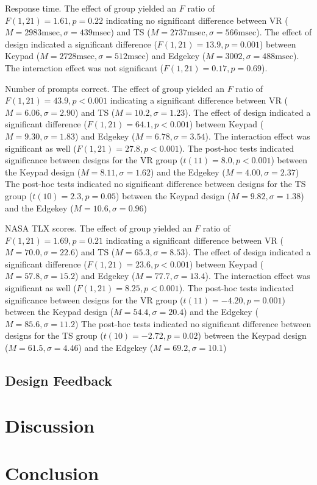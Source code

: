 Response time.
The effect of group yielded an $F$ ratio of $F(1, 21) = 1.61, p = 0.22$ indicating no significant difference between VR ($M = 2983\mathrm{msec}, \sigma = 439\mathrm{msec}$) and TS ($M = 2737\mathrm{msec}, \sigma = 566\mathrm{msec}$).
The effect of design indicated a significant difference ($F(1, 21) = 13.9, p = 0.001$) between Keypad ($M=2728\mathrm{msec}, \sigma=512\mathrm{msec}$) and Edgekey ($M=3002, \sigma=488\mathrm{msec}$).
The interaction effect was not significant ($F(1, 21) = 0.17, p = 0.69$).

Number of prompts correct.
The effect of group yielded an $F$ ratio of $F(1, 21) = 43.9, p < 0.001$ indicating a significant difference between VR ($M = 6.06, \sigma = 2.90$) and TS ($M = 10.2, \sigma = 1.23$).
The effect of design indicated a significant difference ($F(1, 21) = 64.1, p < 0.001$) between Keypad ($M = 9.30, \sigma=1.83$) and Edgekey ($M=6.78, \sigma=3.54$).
The interaction effect was significant as well ($F(1, 21) = 27.8, p < 0.001$).
The post-hoc tests indicated significance between designs for the VR group ($t(11) = 8.0, p < 0.001$) between the Keypad design ($M = 8.11, \sigma = 1.62$) and the Edgekey ($M = 4.00, \sigma = 2.37$)
The post-hoc tests indicated no significant difference between designs for the TS group ($t(10) = 2.3, p = 0.05$) between the Keypad design ($M = 9.82, \sigma = 1.38$) and the Edgekey ($M = 10.6, \sigma = 0.96$)

NASA TLX scores.
The effect of group yielded an $F$ ratio of $F(1, 21) = 1.69, p = 0.21$ indicating a significant difference between VR ($M = 70.0, \sigma = 22.6$) and TS ($M = 65.3, \sigma = 8.53$).
The effect of design indicated a significant difference ($F(1, 21) = 23.6, p < 0.001$) between Keypad ($M = 57.8, \sigma=15.2$) and Edgekey ($M=77.7, \sigma=13.4$).
The interaction effect was significant as well ($F(1, 21) = 8.25, p < 0.001$).
The post-hoc tests indicated significance between designs for the VR group ($t(11) = -4.20, p = 0.001$) between the Keypad design ($M = 54.4, \sigma = 20.4$) and the Edgekey ($M = 85.6, \sigma = 11.2$)
The post-hoc tests indicated no significant difference between designs for the TS group ($t(10) = -2.72, p = 0.02$) between the Keypad design ($M = 61.5, \sigma = 4.46$) and the Edgekey ($M = 69.2, \sigma = 10.1$)

\subsection{Design Feedback}

\section{Discussion}



\section{Conclusion}
